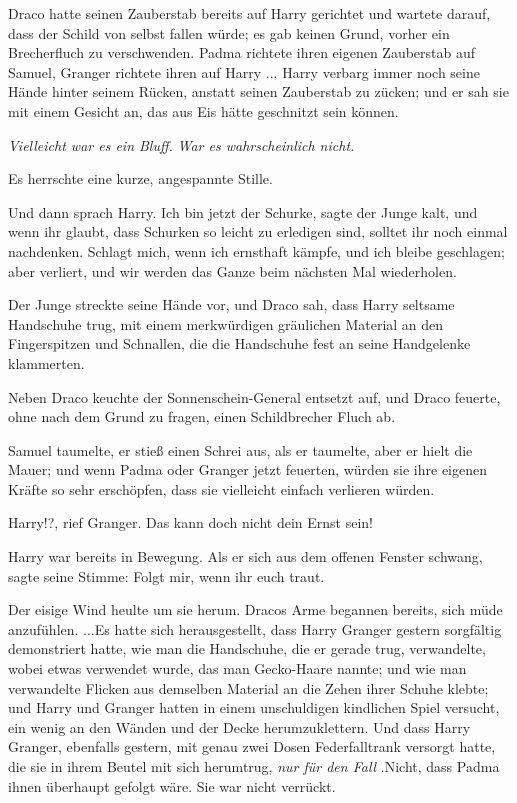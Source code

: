 Draco hatte seinen Zauberstab bereits auf Harry gerichtet und wartete darauf,
dass der Schild von selbst fallen würde; es gab keinen Grund, vorher ein
Brecherfluch zu verschwenden. Padma richtete ihren eigenen Zauberstab auf
Samuel, Granger richtete ihren auf Harry ... Harry verbarg immer noch seine Hände
hinter seinem Rücken, anstatt seinen Zauberstab zu zücken; und er sah sie mit
einem Gesicht an, das aus Eis hätte geschnitzt sein können.

\emph{Vielleicht war es ein Bluff.}
\emph{War es wahrscheinlich nicht.}

Es herrschte eine kurze, angespannte Stille.

Und dann sprach Harry. \glqq{}Ich bin jetzt der Schurke\grqq{}, sagte der Junge
kalt, \glqq{}und wenn ihr glaubt, dass Schurken so leicht zu erledigen sind,
solltet ihr noch einmal nachdenken. Schlagt mich, wenn ich ernsthaft kämpfe, und
ich bleibe geschlagen; aber verliert, und wir werden das Ganze beim nächsten Mal
wiederholen.\grqq{}

Der Junge streckte seine Hände vor, und Draco sah, dass Harry seltsame
Handschuhe trug, mit einem merkwürdigen gräulichen Material an den Fingerspitzen
und Schnallen, die die Handschuhe fest an seine Handgelenke klammerten.

Neben Draco keuchte der Sonnenschein-General entsetzt auf, und Draco feuerte,
ohne nach dem Grund zu fragen, einen Schildbrecher Fluch ab.

Samuel taumelte, er stieß einen Schrei aus, als er taumelte, aber er hielt die
Mauer; und wenn Padma oder Granger jetzt feuerten, würden sie ihre eigenen
Kräfte so sehr erschöpfen, dass sie vielleicht einfach verlieren würden.

\glqq{}Harry!?\grqq{}, rief Granger. \glqq{}Das kann doch nicht dein Ernst sein!\grqq{}

Harry war bereits in Bewegung. Als er sich aus dem offenen Fenster schwang,
sagte seine Stimme: \glqq{}Folgt mir, wenn ihr euch traut.\grqq{}

Der eisige Wind heulte um sie herum. Dracos Arme begannen bereits, sich müde
anzufühlen. ...Es hatte sich herausgestellt, dass Harry Granger gestern
sorgfältig demonstriert hatte, wie man die Handschuhe, die er gerade trug,
verwandelte, wobei etwas verwendet wurde, das man \glqq{}Gecko-Haare\grqq{}
nannte; und wie man verwandelte Flicken aus demselben Material an die Zehen
ihrer Schuhe klebte; und Harry und Granger hatten in einem unschuldigen
kindlichen Spiel versucht, ein wenig an den Wänden und der Decke
herumzuklettern. Und dass Harry Granger, ebenfalls gestern, mit genau zwei Dosen
Federfalltrank versorgt hatte, die sie in ihrem Beutel mit sich herumtrug,
\emph{\glqq{}nur für den Fall\grqq{}} .Nicht, dass Padma ihnen überhaupt gefolgt
wäre. Sie war nicht verrückt.

